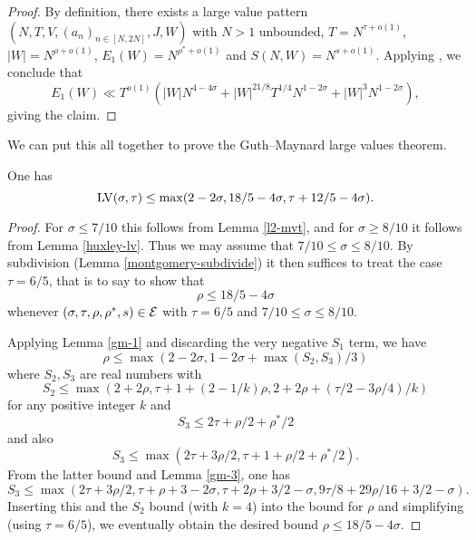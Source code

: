 \literature
{}

\begin{proof} By definition, there exists a large value pattern $(N,T,V,(a_n)_{n \in [N,2N]},J,W)$ with $N>1$ unbounded, $T = N^{\tau+o(1)}$, $|W| = N^{\rho+o(1)}$, $E_1(W) = N^{\rho^*+o(1)}$ and $S(N,W) = N^{s+o(1)}$.  Applying \cite[Proposition 11.1]{guth-maynard}, we conclude that
    $$ E_1(W) \ll T^{o(1)} ( |W| N^{4-4\sigma} + |W|^{21/8} T^{1/4} N^{1-2\sigma} + |W|^3 N^{1-2\sigma} ),$$
giving the claim.
\end{proof}

We can put this all together to prove the Guth--Maynard large values theorem.

\begin{theorem}\label{guth-maynard-lvt}\cite[Theorem~1.1]{guth-maynard} One has
    $$ \mathrm{LV}(\sigma,\tau) \leq \max(2-2\sigma, 18/5 - 4 \sigma, \tau + 12/5 - 4\sigma).$$
\end{theorem}

\literature
{}
\derived
{}

\begin{proof} For $\sigma \leq 7/10$ this follows from Lemma \ref{l2-mvt}, and for $\sigma \geq 8/10$ it follows from Lemma \ref{huxley-lv}.  Thus we may assume that $7/10 \leq \sigma \leq 8/10$.  By subdivision (Lemma \ref{montgomery-subdivide}) it then suffices to treat the case $\tau = 6/5$, that is to say to show that
    $$ \rho \leq 18/5-4\sigma$$
whenever $(\sigma,\tau,\rho,\rho^*,s) \in \mathcal{E}$ with $\tau=6/5$ and $7/10 \leq \sigma \leq 8/10$.

Applying Lemma \ref{gm-1} and discarding the very negative $S_1$ term, we have
$$ \rho \leq \max(2-2\sigma, 1-2\sigma + \max(S_2, S_3)/3)$$
where $S_2, S_3$ are real numbers with
$$ S_2 \leq \max(2+2\rho, \tau+1+(2-1/k) \rho, 2 + 2\rho + (\tau/2 - 3\rho/4)/k )$$
for any positive integer $k$ and
$$ S_3 \leq 2\tau + \rho/2 + \rho^*/2$$
and also
$$ S_3 \leq \max( 2\tau + 3\rho/2, \tau+1+\rho/2+\rho^*/2).$$
From the latter bound and Lemma \ref{gm-3}, one has
$$ S_3 \leq \max( 2\tau+3\rho/2, \tau+\rho+3-2\sigma, \tau+2\rho+3/2-\sigma, 9\tau/8+29\rho/16 + 3/2-\sigma).$$
Inserting this and the $S_2$ bound (with $k=4$) into the bound for $\rho$ and simplifying (using $\tau=6/5$), we eventually obtain
the desired bound $\rho \leq 18/5-4\sigma$.
\end{proof}

